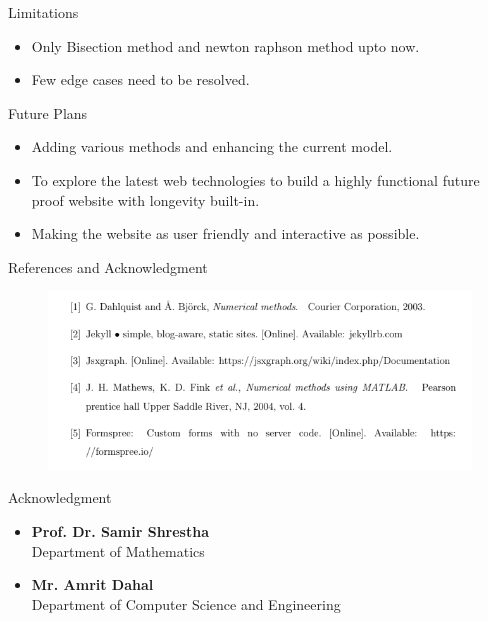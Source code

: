 \documentclass[12pt]{beamer}
\begin{document}
	
		\begin{frame}{Limitations}
		\begin{itemize}
			
			\item {Only  Bisection method and newton raphson method upto now.}
			
			\item {Few edge cases need to be resolved.}
			
			
			
		\end{itemize}
		
	\end{frame}
	\begin{frame}{Future Plans}
\begin{itemize}
	
	\item {Adding various methods and enhancing the current model.}
	
	\item {To explore the latest web technologies to build a highly functional future proof website with longevity built-in.}
	
	\item {Making the website as user friendly and interactive as possible.}
	
\end{itemize}
	\end{frame}

	\begin{frame}{References and Acknowledgment}
     \begin{figure}
     	\centering
     	\includegraphics[width=0.95\linewidth]{ref.png}
    
     \end{figure}
		
\end{frame}
		\begin{frame}{ Acknowledgment}


\begin{itemize}
	\item \textbf{Prof. Dr. Samir Shrestha}\\ 
	
	Department of Mathematics


	\item \textbf{Mr. Amrit Dahal}\\Department of Computer Science and Engineering
\end{itemize}

	\end{frame}
\end{document}
